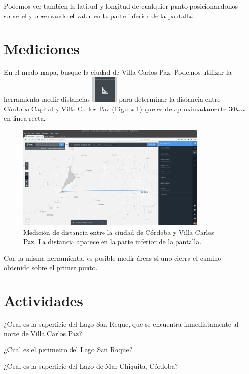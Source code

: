 \documentclass[a4paper,12pt]{book}
\begin{document}
Podemos ver tambien la latitud y longitud de cualquier punto posicionandonos sobre el y observando el valor en la parte inferior de la pantalla.




\section{Mediciones}

En el modo mapa, busque la ciudad de Villa Carlos Paz. Podemos utilizar la herramienta medir distancias \includegraphics[scale=0.2]{in:medir.png} para determinar la distancia entre Córdoba Capital y Villa Carlos Paz (Figura \ref{fig:distancia}) que es de aproximadamente $30km$ en linea recta.

\begin{figure}[!h]
    \centering
    \includegraphics[width=0.85\textwidth]{fig:distancia.png}
    \caption{Medición de distancia entre la ciudad de Córdoba y Villa Carlos Paz. La distancia aparece en la parte inferior de la pantalla.}
    \label{fig:distancia}
\end{figure}

Con la misma herramienta, es posible medir áreas si uno cierra el camino obtenido sobre el primer punto.

\section{Actividades}

\begin{que}
    ¿Cual es la superficie del Lago San Roque, que se encuentra inmediatamente al norte de Villa Carlos Paz?
\end{que}
\begin{que}
    ¿Cual es el perimetro del Lago San Roque?
\end{que}
\begin{que}
    ¿Cual es la superficie del Lago de Mar Chiquita, Córdoba?
\end{que}
\end{document}
